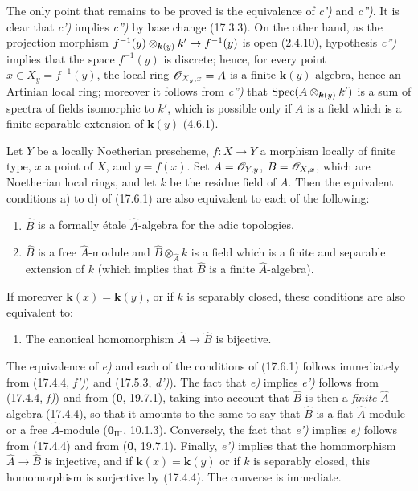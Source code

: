 The only point that remains to be proved is the equivalence of \emph{c')} and \emph{c'')}. It is clear that \emph{c')} implies \emph{c'')} by base change (17.3.3). On the other hand, as the projection morphism $f^{-1}(y)\otimes_{\boldsymbol{k}(y)}k'\to f^{-1}(y)$ is open (2.4.10), hypothesis \emph{c'')} implies that the space $f^{-1}(y)$ is discrete; hence, for every point $x\in X_y=f^{-1}(y)$, the local ring $\mathscr{O}_{X_y,x}=A$ is a finite $\boldsymbol{k}(y)$-algebra, hence an Artinian local ring; moreover it follows from \emph{c'')} that $\operatorname{Spec}(A\otimes_{\boldsymbol{k}(y)}k')$ is a sum of spectra of fields isomorphic to $k'$, which is possible only if $A$ is a field which is a finite separable extension of $\boldsymbol{k}(y)$ (4.6.1).

\begin{proposition}[17.6.3]
\label{IV.17.6.3}
Let $Y$ be a \textup{locally Noetherian} prescheme, $f:X\to Y$ a morphism locally of finite type, $x$ a point of $X$, and $y=f(x)$. Set $A=\mathscr{O}_{Y,y}$, $B=\mathscr{O}_{X,x}$, which are Noetherian local rings, and let $k$ be the residue field of $A$. Then the equivalent conditions \textup{a)} to \textup{d)} of \textup{(17.6.1)} are also equivalent to each of the following:
\begin{enumerate}
  \item[\textup{e)}] $\widehat B$ is a formally étale $\widehat A$-algebra for the adic topologies.
  \item[\textup{e$'$)}] $\widehat B$ is a free $\widehat A$-module and $\widehat B\otimes_{\widehat A}k$ is a field which is a finite and separable extension of $k$ \textup{(which implies that $\widehat B$ is a} finite \textup{$\widehat A$-algebra)}.
\end{enumerate}
If moreover $\boldsymbol{k}(x)=\boldsymbol{k}(y)$, or if $k$ is separably closed, these conditions are also equivalent to:
\begin{enumerate}
  \item[\textup{e$''$)}] The canonical homomorphism $\widehat A\to\widehat B$ is bijective.
\end{enumerate}
\end{proposition}

The equivalence of \emph{e)} and each of the conditions of (17.6.1) follows immediately from (17.4.4, \emph{f')}) and (17.5.3, \emph{d')}). The fact that \emph{e)} implies \emph{e')} follows from (17.4.4, \emph{f)}) and from (\textbf{0}, 19.7.1), taking into account that $\widehat B$ is then a \emph{finite} $\widehat A$-algebra (17.4.4), so that it amounts to the same to say that $\widehat B$ is a flat $\widehat A$-module or a free $\widehat A$-module ($\mathbf{0}_{\mathrm{III}}$, 10.1.3). Conversely, the fact that \emph{e')} implies \emph{e)} follows from (17.4.4) and from (\textbf{0}, 19.7.1). Finally, \emph{e')} implies that the homomorphism $\widehat A\to\widehat B$ is injective, and if $\boldsymbol{k}(x)=\boldsymbol{k}(y)$ or if $k$ is separably closed, this homomorphism is surjective by (17.4.4). The converse is immediate.

